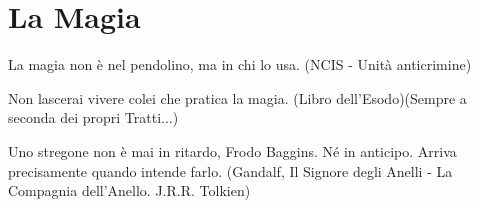 \section{La Magia}\label{lamagia}

\begin{enfasi}{
La magia non è nel pendolino, ma in chi lo usa. (NCIS - Unità anticrimine)

\medskip

Non lascerai vivere colei che pratica la magia. (Libro dell'Esodo)(Sempre a seconda dei propri Tratti...)

\medskip

Uno stregone non è mai in ritardo, Frodo Baggins. Né in anticipo. Arriva precisamente quando intende farlo. (Gandalf, Il Signore degli Anelli - La Compagnia dell'Anello. J.R.R. Tolkien)} \end{enfasi}

